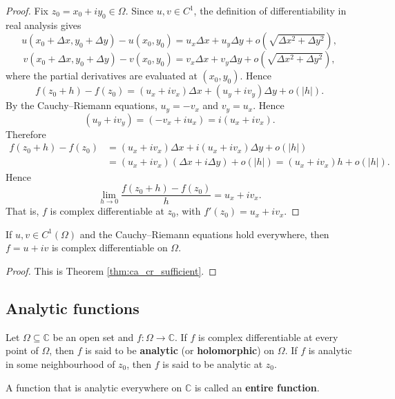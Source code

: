 \begin{proof}
Fix $z_0 = x_0 + iy_0 \in \Omega$. Since $u, v \in C^1$, the definition of differentiability in real analysis gives
\[
u(x_0 + \Delta x, y_0 + \Delta y) - u(x_0, y_0) = u_x \Delta x + u_y \Delta y + o(\sqrt{\Delta x^2 + \Delta y^2}),
\]
\[
v(x_0 + \Delta x, y_0 + \Delta y) - v(x_0, y_0) = v_x \Delta x + v_y \Delta y + o(\sqrt{\Delta x^2 + \Delta y^2}),
\]
where the partial derivatives are evaluated at $(x_0, y_0)$. Hence
\[
f(z_0 + h) - f(z_0) = (u_x + iv_x)\Delta x + (u_y + iv_y)\Delta y + o(|h|).
\]
By the Cauchy--Riemann equations, $u_y = -v_x$ and $v_y = u_x$. Hence
\[
(u_y + iv_y) = (-v_x + i u_x) = i(u_x + i v_x).
\]
Therefore
\[
\begin{aligned}
f(z_0 + h) - f(z_0) &= (u_x + iv_x)\Delta x + i(u_x + iv_x)\Delta y + o(|h|)\\
&= (u_x + iv_x)(\Delta x + i\Delta y) + o(|h|) = (u_x + iv_x)h + o(|h|).
\end{aligned}
\]
Hence
\[
\lim_{h \to 0} \frac{f(z_0 + h) - f(z_0)}{h} = u_x + iv_x.
\]
That is, $f$ is complex differentiable at $z_0$, with $f'(z_0) = u_x + iv_x$.
\end{proof}

\begin{corollary}\label{cor:ca_cr_sufficient}
If $u, v \in C^1(\Omega)$ and the Cauchy--Riemann equations hold everywhere, then $f = u + iv$ is complex differentiable on $\Omega$.
\end{corollary}

\begin{proof}
This is Theorem \ref{thm:ca_cr_sufficient}.
\end{proof}

\subsection{Analytic functions}

\begin{definition}\label{def:ca_analytic_function}
Let $\Omega \subseteq \mathbb{C}$ be an open set and $f: \Omega \to \mathbb{C}$. If $f$ is complex differentiable at every point of $\Omega$, then $f$ is said to be \textbf{analytic} (or \textbf{holomorphic}) on $\Omega$. If $f$ is analytic in some neighbourhood of $z_0$, then $f$ is said to be analytic at $z_0$.
\end{definition}

\begin{definition}\label{def:ca_entire_function}
A function that is analytic everywhere on $\mathbb{C}$ is called an \textbf{entire function}.
\end{definition}

